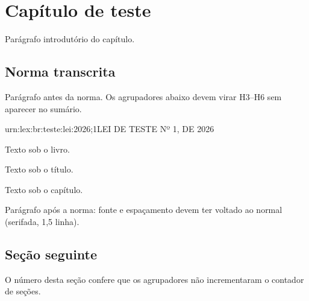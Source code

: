 \documentclass[11pt,a5paper,twoside,openany]{book}
\begin{document}
\TOCAcessivel
\mainmatter

\chapter{Capítulo de teste}          %

Parágrafo introdutório do capítulo.

\section{Norma transcrita}           %

Parágrafo antes da norma. Os agrupadores abaixo devem virar
H3–H6 sem aparecer no sumário.

\begin{LegNorma}{urn:lex:br:teste:lei:2026;1}{LEI DE TESTE Nº 1, DE 2026}



Texto sob o livro.


Texto sob o título.


Texto sob o capítulo.



\end{LegNorma}

Parágrafo após a norma: fonte e espaçamento devem ter voltado
ao normal (serifada, 1,5 linha).

\section{Seção seguinte}             %

O número desta seção confere que os agrupadores não incrementaram
o contador de seções.
\end{document}
